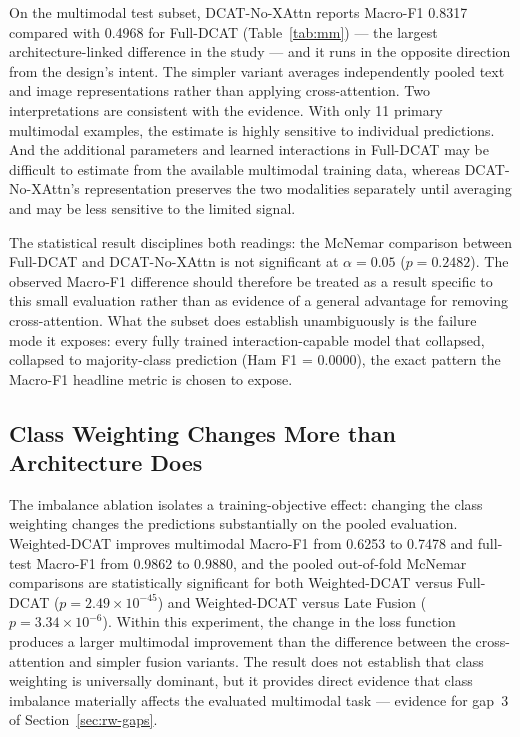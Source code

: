 \documentclass[10pt,twoside]{article}
\begin{document}
On the multimodal test subset, DCAT-No-XAttn reports Macro-F1 0.8317 compared with 0.4968 for Full-DCAT (Table~\ref{tab:mm}) --- the largest architecture-linked difference in the study --- and it runs in the opposite direction from the design's intent. The simpler variant averages independently pooled text and image representations rather than applying cross-attention. Two interpretations are consistent with the evidence. With only 11 primary multimodal examples, the estimate is highly sensitive to individual predictions. And the additional parameters and learned interactions in Full-DCAT may be difficult to estimate from the available multimodal training data, whereas DCAT-No-XAttn's representation preserves the two modalities separately until averaging and may be less sensitive to the limited signal.

The statistical result disciplines both readings: the McNemar comparison between Full-DCAT and DCAT-No-XAttn is not significant at $\alpha = 0.05$ ($p = 0.2482$). The observed Macro-F1 difference should therefore be treated as a result specific to this small evaluation rather than as evidence of a general advantage for removing cross-attention. What the subset does establish unambiguously is the failure mode it exposes: every fully trained interaction-capable model that collapsed, collapsed to majority-class prediction (Ham F1 = 0.0000), the exact pattern the Macro-F1 headline metric is chosen to expose.

\subsection{Class Weighting Changes More than Architecture Does}\label{sec:disc-weighting}

The imbalance ablation isolates a training-objective effect: changing the class weighting changes the predictions substantially on the pooled evaluation. Weighted-DCAT improves multimodal Macro-F1 from 0.6253 to 0.7478 and full-test Macro-F1 from 0.9862 to 0.9880, and the pooled out-of-fold McNemar comparisons are statistically significant for both Weighted-DCAT versus Full-DCAT ($p = 2.49 \times 10^{-45}$) and Weighted-DCAT versus Late Fusion ($p = 3.34 \times 10^{-6}$). Within this experiment, the change in the loss function produces a larger multimodal improvement than the difference between the cross-attention and simpler fusion variants. The result does not establish that class weighting is universally dominant, but it provides direct evidence that class imbalance materially affects the evaluated multimodal task --- evidence for gap~3 of Section~\ref{sec:rw-gaps}.
\end{document}

